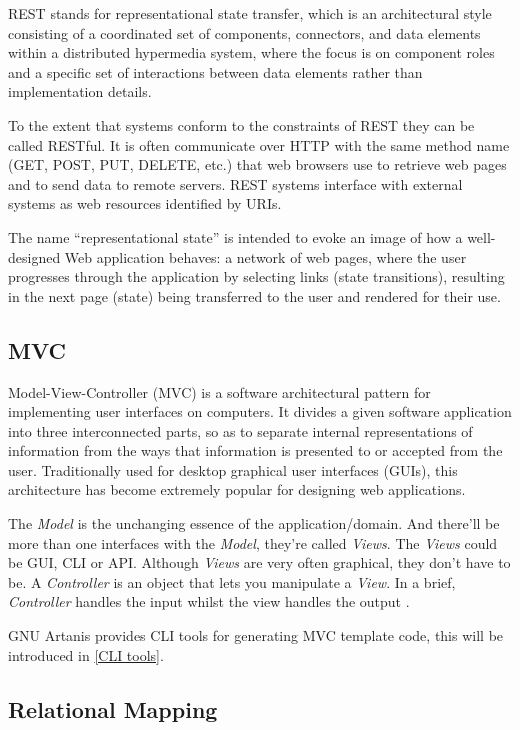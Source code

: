 \documentclass[numbers,numberedpars]{sigplanconf}
\begin{document}
REST stands for representational state transfer, which is an architectural style consisting of a coordinated set of components, connectors,
and data elements within a distributed hypermedia system, where the focus is on component roles and a specific set of interactions between data
elements rather than implementation details.

To the extent that systems conform to the constraints of REST they can be called RESTful. It is often communicate over HTTP with the same method
name (GET, POST, PUT, DELETE, etc.) that web browsers use to retrieve web pages and to send data to remote servers.
REST systems interface with external systems as web resources identified by URIs.

The name ``representational state'' is intended to evoke an image of how a well-designed Web application behaves: a network of web pages,
where the user progresses through the application by selecting links (state transitions), resulting in the next page (state) being transferred to
the user and rendered for their use.



\subsection{MVC}

Model-View-Controller (MVC) is a software architectural pattern for implementing user interfaces on computers. It divides a given software
application into three interconnected parts, so as to separate internal representations of information from the ways that information is
presented to or accepted from the user. Traditionally used for desktop graphical user interfaces (GUIs), this architecture has become extremely
popular for designing web applications.

The {\it Model} is the unchanging essence of the application/domain. And there'll be more than one interfaces with the {\it Model}, they're called
{\it Views}. The {\it Views} could be GUI, CLI or API. Although {\it Views} are very often graphical, they don’t have to be.
A {\it Controller} is an object that lets you manipulate a {\it View}. In a brief, {\it Controller} handles the input whilst the view handles the
output \citep{deacon2009model}.

GNU Artanis provides CLI tools for generating MVC template code, this will be introduced in \ref{CLI tools}.

\subsection{Relational Mapping}
\end{document}
